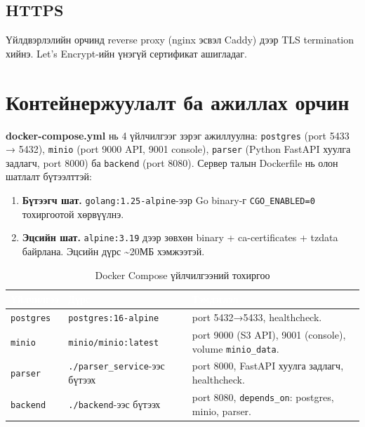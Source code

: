 \subsection{HTTPS}
Үйлдвэрлэлийн орчинд reverse proxy (nginx эсвэл Caddy) дээр TLS termination хийнэ. Let's Encrypt-ийн үнэгүй сертификат ашигладаг.

\section{Контейнержуулалт ба ажиллах орчин}
\textbf{docker-compose.yml} нь 4 үйлчилгээг зэрэг ажиллуулна: \texttt{postgres} (port 5433 → 5432), \texttt{minio} (port 9000 API, 9001 console), \texttt{parser} (Python FastAPI хуулга задлагч, port 8000) ба \texttt{backend} (port 8080). Сервер талын Dockerfile нь олон шатлалт бүтээлттэй:
\begin{enumerate}
    \item \textbf{Бүтээгч шат.} \texttt{golang:1.25-alpine}-ээр Go binary-г \texttt{CGO\_ENABLED=0} тохиргоотой хөрвүүлнэ.
    \item \textbf{Эцсийн шат.} \texttt{alpine:3.19} дээр зөвхөн binary + ca-certificates + tzdata байрлана. Эцсийн дүрс \textasciitilde{}20МБ хэмжээтэй.
\end{enumerate}

\begin{table}[ht]
\centering
\footnotesize
\renewcommand{\arraystretch}{1.25}
\begin{tabular}{|l|p{4cm}|p{5cm}|}
\hline
\rowcolor{darknavy}
\textcolor{white}{\textbf{Үйлчилгээ}} & \textcolor{white}{\textbf{Дүрс}} & \textcolor{white}{\textbf{Тэмдэглэл}} \\ \hline
\texttt{postgres} & \texttt{postgres:16-alpine}            & port 5432→5433, healthcheck. \\ \hline
\texttt{minio}    & \texttt{minio/minio:latest}            & port 9000 (S3 API), 9001 (console), volume \texttt{minio\_data}. \\ \hline
\texttt{parser}   & \texttt{./parser\_service}-ээс бүтээх  & port 8000, FastAPI хуулга задлагч, healthcheck. \\ \hline
\texttt{backend}  & \texttt{./backend}-ээс бүтээх          & port 8080, \texttt{depends\_on}: postgres, minio, parser. \\ \hline
\end{tabular}
\caption{Docker Compose үйлчилгээний тохиргоо}
\label{tab:docker}
\end{table}

